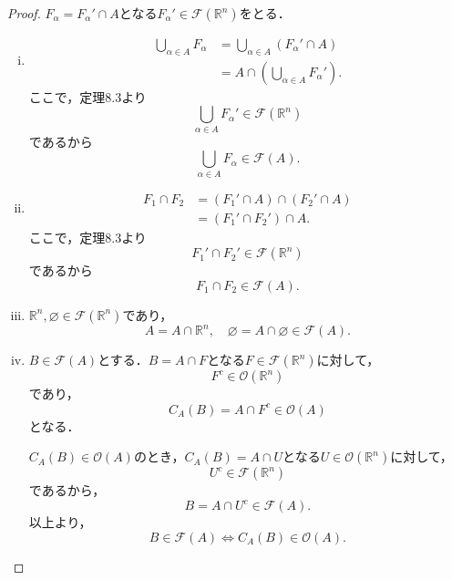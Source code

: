\begin{leftbar}
    \begin{proof}
        $F_\alpha = F_{\alpha} ' \cap A$となる$F_{\alpha} ' \in \mathcal{F} (\mathbb{R}^n)$をとる．
        \begin{enumerate}[(i)]
            \item
                  \begin{align*}
                      \bigcup_{\alpha \in A} F_\alpha & = \bigcup_{\alpha \in A} (F_{\alpha} ' \cap A)  \\
                                                      & = A \cap (\bigcup_{\alpha \in A} F_{\alpha} ').
                  \end{align*}
                  ここで，定理8.3より
                  \[
                      \bigcup_{\alpha \in A} F_{\alpha} ' \in \mathcal{F} (\mathbb{R}^n)
                  \]
                  であるから
                  \[
                      \bigcup_{\alpha \in A} F_\alpha \in \mathcal{F} (A).
                  \]
            \item
                  \begin{align*}
                      F_1 \cap F_2 & = (F_1 ' \cap A) \cap (F_2 ' \cap A) \\
                                   & = (F_1 ' \cap F_2 ') \cap A.
                  \end{align*}
                  ここで，定理8.3より
                  \[
                      F_1 ' \cap F_2 ' \in \mathcal{F} (\mathbb{R}^n)
                  \]
                  であるから
                  \[
                      F_1 \cap F_2 \in \mathcal{F} (A).
                  \]
            \item
                  $\mathbb{R}^n, \varnothing \in \mathcal{F} (\mathbb{R}^n)$であり，
                  \[
                      A = A \cap \mathbb{R}^n, \quad \varnothing = A \cap \varnothing \in \mathcal{F} (A).
                  \]
            \item $B \in \mathcal{F} (A)$とする．$B =  A \cap F$となる$F \in \mathcal{F} (\mathbb{R}^n)$に対して，
                  \[
                      F^c\in \mathcal{O} (\mathbb{R}^n)
                  \]
                  であり，
                  \[
                      C_A (B) = A \cap F^c \in \mathcal{O} (A)
                  \]
                  となる．

                  $C_A (B) \in \mathcal{O}(A)$のとき，$C_A (B) = A \cap U$となる$U \in \mathcal{O} (\mathbb{R}^n)$に対して，
                  \[
                      U^c \in \mathcal{F} (\mathbb{R}^n)
                  \]
                  であるから，
                  \[
                      B = A \cap U^c \in \mathcal{F} (A).
                  \]
                  以上より，
                  \[
                      B \in \mathcal{F} (A) \iff C_A (B) \in \mathcal{O} (A).
                  \]
        \end{enumerate}
    \end{proof}
\end{leftbar}


